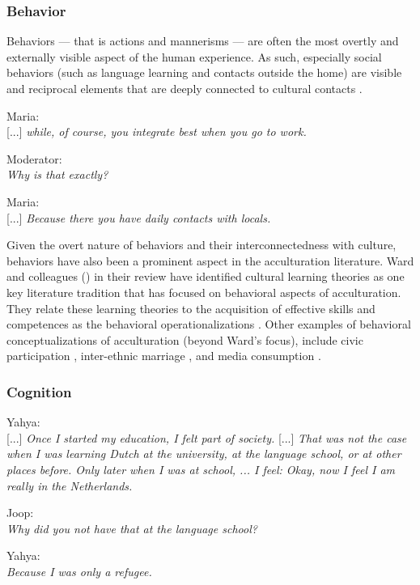 \documentclass[man, 12pt, a4paper, mask]{apa7}
\begin{document}
\subsubsection{Behavior}
Behaviors --- that is actions and mannerisms --- are often the most overtly and externally visible aspect of the human experience. As such, especially social behaviors (such as language learning and contacts outside the home) are visible and reciprocal elements that are deeply connected to cultural contacts \citep[e.g.,][]{Legare2019, Whiting1980, imai2016}.

\begin{displayquote}
    Maria:\\
    {[...]} \textit{while, of course, you integrate best when you go to work.}
    
    Moderator:\\
    \textit{Why is that exactly?}
    
    Maria:\\
    {[...]} \textit{Because there you have daily contacts with locals.}
\end{displayquote}

Given the overt nature of behaviors and their interconnectedness with culture, behaviors have also been a prominent aspect in the acculturation literature. Ward and colleagues (\citeyear{Ward2019}) in their review have identified cultural learning theories as one key literature tradition that has focused on behavioral aspects of acculturation. They relate these learning theories to the acquisition of effective skills and competences as the behavioral operationalizations \citep[including, verbal and non-verbal communication skills][]{Ward2001}. Other examples of behavioral conceptualizations of acculturation (beyond Ward's focus), include civic participation \citep[e.g., voting;][]{Lessard-Phillips2020}, inter-ethnic marriage \citep[e.g.,][]{Song2009}, and media consumption \citep[e.g.,][]{Shoemaker1985}. 

\subsubsection{Cognition}
\begin{displayquote}
    Yahya:\\
    {[...]} \textit{Once I started my education, I felt part of society.} {[...]} \textit{That was not the case when I was learning Dutch at the university, at the language school, or at other places before. Only later when I was at school, ... I feel: Okay, now I feel I am really in the Netherlands.}
    
    Joop:\\
    \textit{Why did you not have that at the language school?}
    
    Yahya:\\
    \textit{Because I was only a refugee.}
\end{displayquote}
\end{document}
